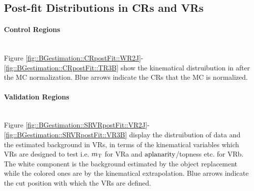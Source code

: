 \clearpage
\subsection{Post-fit Distributions in CRs and VRs}
\paragraph{Control Regions} \mbox{} \\
Figure \ref{fig::BGestimation::CRpostFit::WR2J}-\ref{fig::BGestimation::CRpostFit::TR3B} show the kinematical distruibution in after the MC normalization. Blue arrows indicate the CRs that the MC is normalized. 




\clearpage
\paragraph{Validation Regions} \mbox{} \\
Figure \ref{fig::BGestimation::SRVRpostFit::VR2J}-\ref{fig::BGestimation::SRVRpostFit::VR3B} display the distruibution of data and the estimated background in VRs,
in terms of the kinematical variables which VRs are designed to test i.e. $m_{\mathrm{T}}$ for VRa and $\mathrm{aplanarity}$/topness etc. for VRb. The white component is the background estimated by the object replacement while the colored ones are by the kinematical extrapolation.
Blue arrows indicate the cut position with which the VRs are defined.
%


%
